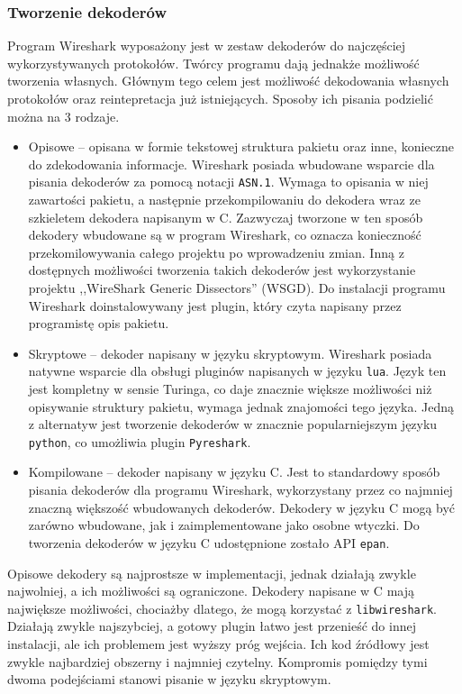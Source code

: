 \documentclass[a4paper, 12pt, twoside, openright]{article}
\begin{document}
	\newpage
	\subsubsection{Tworzenie dekoderów}
	\indent\par
	Program Wireshark wyposażony jest w zestaw dekoderów do najczęściej wykorzystywanych protokołów. Twórcy programu
	dają jednakże możliwość tworzenia własnych. Głównym tego celem jest możliwość
	dekodowania własnych protokołów oraz reintepretacja już istniejących. Sposoby ich pisania podzielić można na 3 rodzaje.
	\begin{itemize}
		\item Opisowe -- opisana w formie tekstowej struktura pakietu oraz inne, konieczne do zdekodowania informacje.
			Wireshark posiada wbudowane wsparcie dla pisania dekoderów za pomocą notacji \texttt{ASN.1}. Wymaga to opisania
			w niej zawartości pakietu, a następnie przekompilowaniu do dekodera wraz ze szkieletem dekodera napisanym w C.
			Zazwyczaj tworzone w ten sposób dekodery wbudowane są w program Wireshark, co oznacza konieczność przekomilowywania
			całego projektu po wprowadzeniu zmian.
			Inną z dostępnych możliwości tworzenia takich dekoderów jest wykorzystanie projektu ,,WireShark Generic Dissectors'' (WSGD).
			Do instalacji programu Wireshark doinstalowywany jest plugin, który czyta napisany przez programistę opis pakietu.
		\item Skryptowe -- dekoder napisany w języku skryptowym. Wireshark posiada natywne wsparcie dla obsługi pluginów
			napisanych w języku \texttt{lua}. Język ten jest kompletny w sensie Turinga, co daje znacznie większe możliwości
			niż opisywanie struktury pakietu, wymaga jednak znajomości tego języka. Jedną z alternatyw jest tworzenie
			dekoderów w znacznie popularniejszym języku \texttt{python}, co umożliwia plugin \texttt{Pyreshark}.
		\item Kompilowane -- dekoder napisany w języku C. Jest to standardowy sposób pisania dekoderów dla programu Wireshark,
			wykorzystany przez co najmniej znaczną większość wbudowanych dekoderów. Dekodery w języku C mogą być zarówno wbudowane,
			jak i zaimplementowane jako osobne wtyczki. Do tworzenia dekoderów w języku C udostępnione zostało API \texttt{epan}.
	\end{itemize}

	Opisowe dekodery są najprostsze w implementacji, jednak działają zwykle najwolniej, a ich możliwości są ograniczone.
	Dekodery napisane w C mają największe możliwości, chociażby dlatego, że mogą korzystać z \texttt{libwireshark}. Działają zwykle
	najszybciej, a gotowy plugin łatwo jest przenieść do innej instalacji, ale ich problemem jest wyższy próg wejścia.
	Ich kod źródłowy jest zwykle najbardziej obszerny i najmniej czytelny. Kompromis pomiędzy tymi dwoma podejściami
	stanowi pisanie w języku skryptowym.
\end{document}
